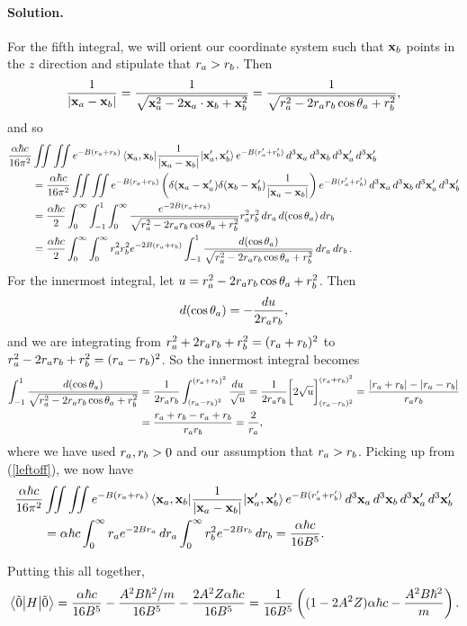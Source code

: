 \documentclass[11pt]{article}
\newcommand{\refeq}[1]{(\ref{#1})}
\newcommand{\beq}{\begin{equation*}}
\newcommand{\eeq}{\end{equation*}}
\newenvironment{solution}
{
    \paragraph{Solution.}
    \ignorespaces
}
{
}
\begin{document}
\begin{solution}
	For the fifth integral, we will orient our coordinate system such that $\vb{x}_b$ points in the $z$ direction and stipulate that $r_a > r_b$.  Then
	\beq
		\frac{1}{\abs{\vxa - \vxb}} = \frac{1}{\sqrt{\vxa^2 - 2 \vxa \cdot \vxb + \vxb^2}}
		= \frac{1}{\sqrt{\ra^2 - 2 \ra \rb \cos\tha + \rb^2}},
	\eeq
	and so
	\begin{align}
		\frac{\alpha \hbar c}{16\pi^2} &\iint \iint e^{-B(r_a + r_b)} \mel{\vb{x}_a, \vb{x}_b}{\frac{1}{\abs{\vb{x}_a- \vb{x}_b}}}{\vb{x}_a', \vb{x}_b'} e^{-B(r_a' + r_b')} \dd[3]{\vb{x}_a} \dd[3]{\vb{x}_b} \dd[3]{\vb{x}_a'} \dd[3]{\vb{x}_b'} \notag \\
		&= \frac{\alpha \hbar c}{16\pi^2} \iint \iint e^{-B(r_a + r_b)}  \left( \delta(\vb{x}_a - \vb{x}_a') \delta(\vb{x}_b - \vb{x}_b') \frac{1}{\abs{\vb{x}_a - \vb{x}_b}} \right) e^{-B(r_a' + r_b')} \dd[3]{\vb{x}_a} \dd[3]{\vb{x}_b} \dd[3]{\vb{x}_a'} \dd[3]{\vb{x}_b'} \notag \\
		&= \frac{\alpha \hbar c}{2} \int_0^\infty \int_{-1}^1 \int_0^\infty \frac{e^{-2B(r_a + r_b)}}{\sqrt{r_a^2 - 2 r_a r_b \cos\theta_a + r_b^2}} r_a^2 r_b^2 \dd{r_a} \dd{(\cos\theta_a)} \dd{r_b} \notag \\
		&= \frac{\alpha \hbar c}{2} \int_0^\infty \int_0^\infty r_a^2 r_b^2 e^{-2B(r_a + r_b)} \int_{-1}^1 \frac{\dd{(\cos\theta_a)}}{\sqrt{r_a^2 - 2 r_a r_b \cos\theta_a + r_b^2}} \dd{r_a} \dd{r_b}. \label{leftoff}
	\end{align}
	For the innermost integral, let $u = r_a^2 - 2 r_a r_b \cos\theta_a + r_b^2$.  Then
	\beq
		\dcta = -\frac{\du}{2 \ra \rb},
	\eeq
	and we are integrating from $r_a^2 + 2 r_a r_b + r_b^2 = (r_a + r_b)^2$ to $r_a^2 - 2 r_a r_b + r_b^2 = (r_a - r_b)^2$.  So the innermost integral becomes
	\begin{align*}
		\int_{-1}^1 \frac{\dd{(\cos\theta_a)}}{\sqrt{r_a^2 - 2 r_a r_b \cos\theta_a + r_b^2}} &= \frac{1}{2 r_a r_b} \int_{(r_a - r_b)^2}^{(r_a + r_b)^2} \frac{\dd{u}}{\sqrt{u}}
		= \frac{1}{2 r_a r_b} \bigg[ 2 \sqrt{u} \bigg]_{(r_a - r_b)^2}^{(r_a + r_b)^2}
		= \frac{\abs{r_a + r_b} - \abs{r_a - r_b}}{r_a r_b} \\
		&= \frac{r_a + r_b - r_a + r_b}{r_a r_b}
		= \frac{2}{r_a},
	\end{align*}
	where we have used $r_a, r_b > 0$ and our assumption that $r_a > r_b$.  Picking up from \refeq{leftoff}, we now have
	\begin{align*}
		\frac{\alpha \hbar c}{16\pi^2} &\iint \iint e^{-B(r_a + r_b)} \mel{\vb{x}_a, \vb{x}_b}{\frac{1}{\abs{\vb{x}_a- \vb{x}_b}}}{\vb{x}_a', \vb{x}_b'} e^{-B(r_a' + r_b')} \dd[3]{\vb{x}_a} \dd[3]{\vb{x}_b} \dd[3]{\vb{x}_a'} \dd[3]{\vb{x}_b'} \\
		&= \alpha \hbar c \int_0^\infty r_a e^{-2B r_a} \dd{r_a} \int_0^\infty r_b^2 e^{-2B r_b} \dd{r_b}
		= \frac{\alpha \hbar c}{16 B^5}.
	\end{align*}
	
	Putting this all together,
	\beq
		\ev{H}{\ot} = \frac{\alp \hbar c}{16 B^5} - \frac{A^2 B \hbar^2 / m}{16 B^5} - \frac{2 A^2 Z \alp \hbar c}{16 B^5}
		= \frac{1}{16 B^5} \left( (1 - 2 A^2 Z) \alp \hbar c - \frac{A^2 B \hbar^2}{m} \right).
	\eeq
\end{solution}
\end{document}

